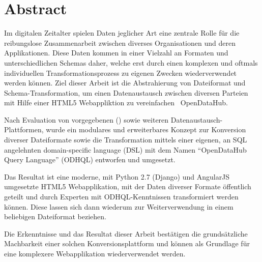 \begin{comment}
2.1.2 Abstract
Ein Abstract ist eine rein textuelle kurze Zusammenfassung der Arbeit. Der Abstract ist für die Recherche in grossen Dokumentensammlungen geeignet. Er umfasst nie mehr als eine Seite, typisch sogar nur etwa 200 Worte (etwa 20 Zeilen).
Der Begriff ‚Kurzfassung’ ist zuwenig genau definiert; er soll wenn möglich vermieden werden.
\end{comment}


{}
\chapter*{Abstract}

Im digitalen Zeitalter spielen Daten jeglicher Art eine zentrale Rolle für die reibungslose Zusammenarbeit zwischen diverses Organisationen und deren Applikationen. Diese Daten kommen in einer Vielzahl an Formaten und unterschiedlichen Schemas daher, welche erst durch einen komplexen und oftmals individuellen Transformationsprozess zu eigenen Zwecken wiederverwendet werden können. Ziel dieser Arbeit ist die Abstrahierung von Dateiformat und Schema-Transformation, um einen Datenaustausch zwischen diversen Parteien mit Hilfe einer HTML5 Webappliktion zu vereinfachen \textendash\ OpenDataHub.

\medskip
Nach Evaluation von vorgegebenen () sowie weiteren Datenaustausch-Plattformen, wurde ein modulares und erweiterbares Konzept zur Konversion diverser Dateiformate sowie die Transformation mittels einer eigenen, an SQL angelehnten domain-specific language (DSL) mit dem Namen ``OpenDataHub Query Language'' (ODHQL) entworfen und umgesetzt.

\medskip
Das Resultat ist eine moderne, mit Python 2.7 (Django) und AngularJS umgesetzte HTML5 Webapplikation, mit der Daten diverser Formate öffentlich geteilt und durch Experten mit ODHQL-Kenntnissen transformiert werden können. Diese lassen sich dann wiederum zur Weiterverwendung in einem beliebigen Dateiformat beziehen.

\medskip
Die Erkenntnisse und das Resultat dieser Arbeit bestätigen die grundsätzliche Machbarkeit einer solchen Konversionsplattform und können als Grundlage für eine komplexere Webapplikation wiederverwendet werden.


\glsresetall